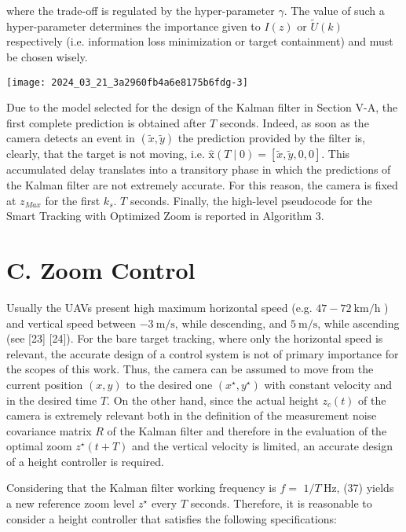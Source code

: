 \documentclass[conference]{IEEEtran}
\begin{document}
where the trade-off is regulated by the hyper-parameter $\gamma$. The value of such a hyper-parameter determines the importance given to $I(z)$ or $\tilde{U}(k)$ respectively (i.e. information loss minimization or target containment) and must be chosen wisely.

\begin{center}
\texttt{[image: 2024\_03\_21\_3a2960fb4a6e8175b6fdg-3]}
\end{center}

Due to the model selected for the design of the Kalman filter in Section V-A, the first complete prediction is obtained after $T$ seconds. Indeed, as soon as the camera detects an event in $(\tilde{x}, \tilde{y})$ the prediction provided by the filter is, clearly, that the target is not moving, i.e. $\hat{\mathrm{x}}(T \mid 0)=[\tilde{x}, \tilde{y}, 0,0]$. This accumulated delay translates into a transitory phase in which the predictions of the Kalman filter are not extremely accurate. For this reason, the camera is fixed at $z_{M a x}$ for the first $k_{s}$. $T$ seconds. Finally, the high-level pseudocode for the Smart Tracking with Optimized Zoom is reported in Algorithm 3.

\section*{C. Zoom Control}
Usually the UAVs present high maximum horizontal speed (e.g. $47-72 \mathrm{~km} / \mathrm{h}$ ) and vertical speed between $-3 \mathrm{~m} / \mathrm{s}$, while descending, and $5 \mathrm{~m} / \mathrm{s}$, while ascending (see [23] [24]). For the bare target tracking, where only the horizontal speed is relevant, the accurate design of a control system is not of primary importance for the scopes of this work. Thus, the camera can be assumed to move from the current position $(x, y)$ to the desired one $\left(x^{\star}, y^{\star}\right)$ with constant velocity and in the desired time $T$. On the other hand, since the actual height $z_{c}(t)$ of the camera is extremely relevant both in the definition of the measurement noise covariance matrix $R$ of the Kalman filter and therefore in the evaluation of the optimal zoom $z^{\star}(t+T)$ and the vertical velocity is limited, an accurate design of a height controller is required.

Considering that the Kalman filter working frequency is $f=$ $1 / T \mathrm{~Hz}$, (37) yields a new reference zoom level $z^{\star}$ every $T$ seconds. Therefore, it is reasonable to consider a height controller that satisfies the following specifications:
\end{document}
